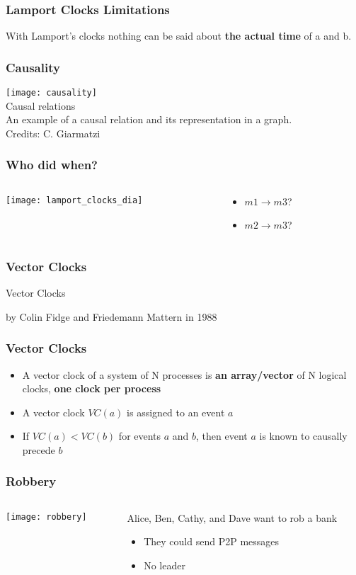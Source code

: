 \documentclass[aspectratio=169, 15pt,usenames,dvipsnames]{beamer}
\begin{document}
	\begin{gdblank}
		\frametitle{Lamport Clocks Limitations}
		\centering
		\large		
		With Lamport’s clocks nothing can be said about \textbf{the actual time} of a and b.
	\end{gdblank}
	\begin{gdblank}
		\frametitle{Causality} 
		\texttt{[image: causality]}
		\centering\\Causal relations\\An example of a causal relation and its representation in a graph. 
		\tiny \\Credits: C. Giarmatzi
	\end{gdblank}   
	\begin{gdblank}
		\frametitle{Who did when?}
		\begin{columns}
			\begin{column}{0.5\textwidth}
				\texttt{[image: lamport\_clocks\_dia]}			
			\end{column}
			\begin{column}{0.5\textwidth}
				\begin{itemize}
					\item $m1 \rightarrow m3$?
					\item $m2 \rightarrow m3$? 
				\end{itemize}
			\end{column}	
		\end{columns}
	\end{gdblank}
	\begin{gdblank}
		\frametitle{Vector Clocks}
		\centering
		\LARGE
		Vector Clocks
		\par\large
		by Colin Fidge and Friedemann Mattern in 1988
	\end{gdblank}
	\begin{gdblank}
		\frametitle{Vector Clocks}
		\centering
		\large
		\begin{itemize}
			\item A vector clock of a system of N processes is \textbf{an array/vector} of N logical clocks, \textbf{one clock per process}
			\item A vector clock $VC(a)$ is assigned to an event $a$
			\item If $VC(a)<VC(b)$ for events $a$ and $b$, then event $a$ is known to causally precede $b$
		\end{itemize}
	\end{gdblank}
	\begin{gdblank}
		\frametitle{Robbery}
		\begin{columns}
			\begin{column}{0.5\textwidth}
				\texttt{[image: robbery]}			
			\end{column}
			\begin{column}{0.5\textwidth}
				Alice, Ben, Cathy, and Dave want to rob a bank
				\begin{itemize}
					\item They could send P2P messages
					\item No leader
				\end{itemize}
			\end{column}	
		\end{columns}
	\end{gdblank}	
\end{document}
